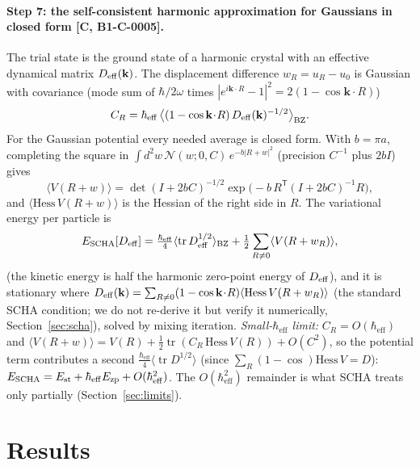 \documentclass[10pt]{article}
\newcommand{\tier}[1]{\textsf{[#1]}}
\newcommand{\hb}{\hbar_{\mathrm{eff}}}
\newcommand{\Ezp}{E_{\mathrm{zp}}}
\newcommand{\Est}{E_{\mathrm{st}}}
\newcommand{\tr}{\operatorname{tr}}
\begin{document}
\paragraph{Step 7: the self-consistent harmonic approximation for Gaussians in closed form \tier{C, B1-C-0005}.} The trial state is the ground state of a harmonic crystal with an effective dynamical matrix $D_{\rm eff}(\mathbf k)$. The displacement difference $w_R=u_R-u_0$ is Gaussian with
covariance (mode sum of $\hbar/2\omega$ times $|e^{i\mathbf k\cdot R}-1|^2=2(1-\cos\mathbf k\!\cdot\!R)$)
\[C_R=\hb\,\bigl\langle(1-\cos\mathbf k\!\cdot\!R)\,D_{\rm eff}(\mathbf k)^{-1/2}\bigr\rangle_{\mathrm{BZ}}.\]
For the Gaussian potential every needed average is closed form. With $b=\pi a$, completing the square in $\int d^2w\,\mathcal N(w;0,C)\,e^{-b|R+w|^2}$ (precision $C^{-1}$ plus $2b I$) gives
\begin{equation}\label{eq:smooth}\langle V(R+w)\rangle=\det(I+2bC)^{-1/2}\exp\!\bigl(-b\,R^{\mathsf T}(I+2bC)^{-1}R\bigr),\end{equation}
and $\langle\mathrm{Hess}\,V(R+w)\rangle$ is the Hessian of the right side in $R$. The variational energy per particle is
\[E_{\rm SCHA}[D_{\rm eff}]=\tfrac{\hb}{4}\langle\tr D_{\rm eff}^{1/2}\rangle_{\mathrm{BZ}}+\tfrac12\sum_{R\ne0}\langle V(R+w_R)\rangle,\]
(the kinetic energy is half the harmonic zero-point energy of $D_{\rm eff}$), and it is stationary where $D_{\rm eff}(\mathbf k)=\sum_{R\ne0}(1-\cos\mathbf k\!\cdot\!R)\langle\mathrm{Hess}\,V(R+w_R)\rangle$ (the standard SCHA condition; we do not re-derive it but
verify it numerically, Section~\ref{sec:scha}), solved by mixing iteration. \emph{Small-$\hb$ limit:} $C_R=O(\hb)$ and $\langle V(R+w)\rangle=V(R)+\tfrac12\tr(C_R\,\mathrm{Hess}\,V(R))+O(C^2)$, so the potential term contributes a second $\tfrac{\hb}{4}\langle\tr D^{1/2}\rangle$
(since $\sum_R(1-\cos)\mathrm{Hess}\,V=D$): $E_{\rm SCHA}=\Est+\hb\Ezp+O(\hb^2)$. The $O(\hb^2)$ remainder is what SCHA treats only partially (Section~\ref{sec:limits}).

\section{Results}\label{sec:results}
\end{document}
